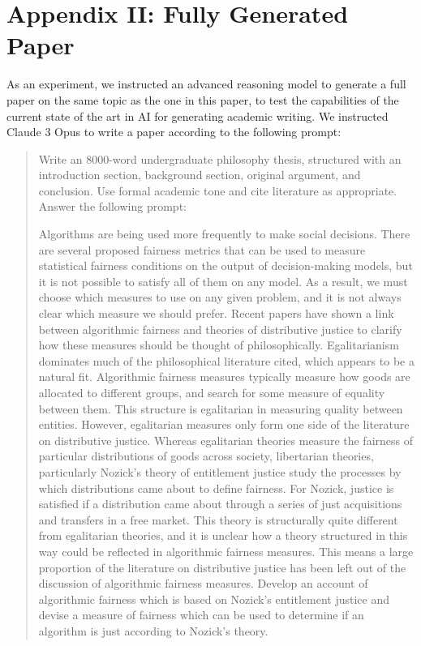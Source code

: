\section{Appendix II: Fully Generated Paper}

As an experiment, we instructed an advanced reasoning model to generate a full
paper on the same topic as the one in this paper, to test the capabilities of
the current state of the art in AI for generating academic writing. We
instructed Claude 3 Opus to write a paper according to the following prompt:
\begin{quote}
    Write an 8000-word undergraduate philosophy thesis, structured with
    an introduction section, background section, original argument, and
    conclusion. Use formal academic tone and cite literature as
    appropriate. Answer the following prompt:

    Algorithms are being used more frequently to make social decisions.
    There are several proposed fairness metrics that can be used to
    measure statistical fairness conditions on the output of
    decision-making models, but it is not possible to satisfy all of
    them on any model. As a result, we must choose which measures to use
    on any given problem, and it is not always clear which measure we
    should prefer. Recent papers have shown a link between algorithmic
    fairness and theories of distributive justice to clarify how these
    measures should be thought of philosophically. Egalitarianism
    dominates much of the philosophical literature cited, which appears
    to be a natural fit. Algorithmic fairness measures typically measure
    how goods are allocated to different groups, and search for some
    measure of equality between them. This structure is egalitarian in
    measuring quality between entities. However, egalitarian measures
    only form one side of the literature on distributive justice.
    Whereas egalitarian theories measure the fairness of  particular
    distributions of goods across society, libertarian theories,
    particularly Nozick's theory of entitlement justice study the
    processes by which distributions came about to define fairness. For
    Nozick, justice is satisfied if a distribution came about through a
    series of just acquisitions and transfers in a free market. This
    theory is structurally quite different from egalitarian theories,
    and it is unclear how a theory structured in this way could be
    reflected in algorithmic fairness measures. This means a large
    proportion of the literature on distributive justice has been left
    out of the discussion of  algorithmic fairness measures. Develop an
    account of algorithmic fairness which is based on Nozick's
    entitlement justice and devise a measure of fairness which can be
    used to determine if an algorithm is just according to Nozick's
    theory.


\end{quote}
